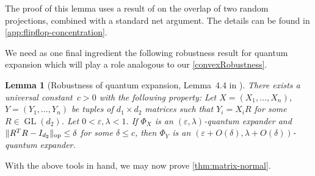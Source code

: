 \documentclass[aos]{imsart}
\newtheorem{lemma}[theorem]{Lemma}
\theoremstyle{definition}
\numberwithin{equation}{section}
\DeclareMathOperator{\op}{op}
\DeclareMathOperator{\GL}{GL}
\DeclarePairedDelimiter{\norm}{\lVert}{\rVert}
\newcommand{\eps}{\varepsilon}
\begin{document}
The proof of this lemma uses a result of \cite{hayden2006aspects} on the overlap of two random projections, combined with a standard net argument.
The details can be found in \cref{app:flipflop-concentration}.

We need as one final ingredient the following robustness result for quantum expansion which will play a role analogous to our \cref{convexRobustness}.

\begin{lemma}[Robustness of quantum expansion, Lemma~4.4 in \cite{FM20}]\label{lem:robust expansion}
There exists a universal constant~$c>0$ with the following property:
Let $X=(X_1,\dots,X_n)$, $Y=(Y_1,\dots,Y_n)$ be tuples of $d_1\times d_2$ matrices such that $Y_i = X_i R$ for some~$R \in \GL(d_2)$.
Let $0<\eps,\lambda<1$.
If $\Phi_X$ is an $(\eps,\lambda)$-quantum expander and $\norm{R^TR - I_{d_2}}_{\op} \leq \delta$ for some $\delta\leq c$, then $\Phi_Y$ is an $(\eps + O(\delta), \lambda + O(\delta))$-quantum expander.
\end{lemma}

With the above tools in hand, we may now prove \cref{thm:matrix-normal}.
\end{document}
